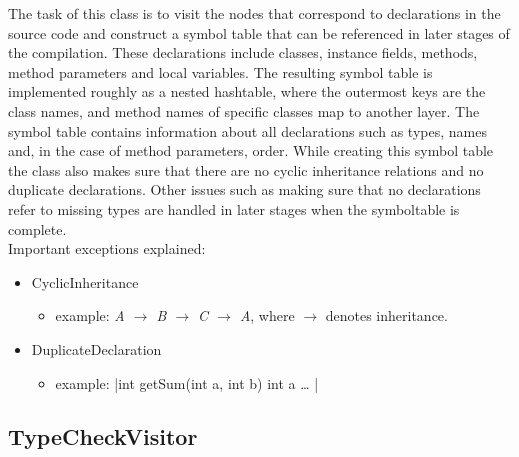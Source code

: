 \documentclass[paper=a4, fontsize=11pt]{scrartcl} %
\numberwithin{equation}{section} %
\numberwithin{figure}{section} %
\numberwithin{table}{section} %
\begin{document}
The task of this class is to visit the nodes that correspond to declarations in the source code and construct a symbol table that can be referenced in later stages of the compilation.
These declarations include classes, instance fields, methods, method parameters and local variables.
The resulting symbol table is implemented roughly as a nested hashtable, where the outermost keys are the class names, and method names of specific classes map to another layer.
The symbol table contains information about all declarations such as types, names and, in the case of method parameters, order.
While creating this symbol table the class also makes sure that there are no cyclic inheritance relations and no duplicate declarations.
Other issues such as making sure that no declarations refer to missing types are handled in later stages when the symboltable is complete.\\

Important exceptions explained:
\begin{itemize}
  \item{CyclicInheritance}
  \begin{itemize}
    \item{example: \emph{A $\rightarrow$ B $\rightarrow$ C $\rightarrow$ A}, where \emph{$\rightarrow$} denotes inheritance.}
  \end{itemize}
  \item{DuplicateDeclaration}
  \begin{itemize}
    \item{example: |int getSum(int a, int b){ int a … }|}
  \end{itemize}
\end{itemize}

\subsection{TypeCheckVisitor}
\end{document}
